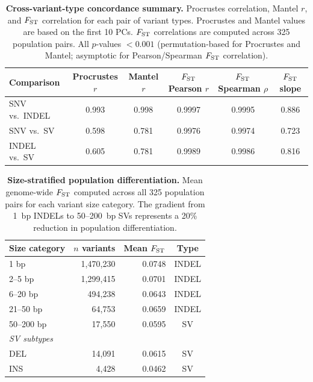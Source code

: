 \begin{table}[ht]
\centering
\caption{\textbf{Cross-variant-type concordance summary.} Procrustes correlation, Mantel $r$, and $F_\mathrm{ST}$ correlation for each pair of variant types. Procrustes and Mantel values are based on the first 10 PCs. $F_\mathrm{ST}$ correlations are computed across 325 population pairs. All $p$-values $< 0.001$ (permutation-based for Procrustes and Mantel; asymptotic for Pearson/Spearman $F_\mathrm{ST}$ correlation).}
\label{tab:concordance}
\begin{tabular}{lccccc}
\toprule
Comparison & Procrustes $r$ & Mantel $r$ & $F_\mathrm{ST}$ Pearson $r$ & $F_\mathrm{ST}$ Spearman $\rho$ & $F_\mathrm{ST}$ slope \\
\midrule
SNV vs.\ INDEL & 0.993 & 0.998 & 0.9997 & 0.9995 & 0.886 \\
SNV vs.\ SV    & 0.598 & 0.781 & 0.9976 & 0.9974 & 0.723 \\
INDEL vs.\ SV  & 0.605 & 0.781 & 0.9989 & 0.9986 & 0.816 \\
\bottomrule
\end{tabular}
\end{table}

\begin{table}[ht]
\centering
\caption{\textbf{Size-stratified population differentiation.} Mean genome-wide $F_\mathrm{ST}$ computed across all 325 population pairs for each variant size category. The gradient from 1~bp INDELs to 50--200~bp SVs represents a 20\% reduction in population differentiation.}
\label{tab:sizefst}
\begin{tabular}{lrrc}
\toprule
Size category & $n$ variants & Mean $F_\mathrm{ST}$ & Type \\
\midrule
1 bp      & 1,470,230 & 0.0748 & INDEL \\
2--5 bp   & 1,299,415 & 0.0701 & INDEL \\
6--20 bp  & 494,238   & 0.0643 & INDEL \\
21--50 bp & 64,753    & 0.0659 & INDEL \\
50--200 bp & 17,550   & 0.0595 & SV \\
\midrule
\multicolumn{4}{l}{\textit{SV subtypes}} \\
DEL       & 14,091    & 0.0615 & SV \\
INS       & 4,428     & 0.0462 & SV \\
\bottomrule
\end{tabular}
\end{table}
